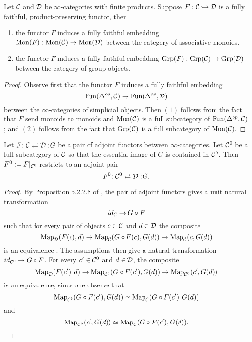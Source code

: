 \begin{proposition}
\label{induced fully faithfulness on group objects}
Let ${\mathcal{C}}$ and ${\mathcal{D}}$ be $\infty$-categories with finite products. Suppose $F:{\mathcal{C}} \hookrightarrow {\mathcal{D}}$ is a fully faithful, product-preserving functor, then
	\begin{enumerate}[(1)]
		\item the functor $F$ induces a fully faithful embedding $\operatorname{Mon}(F):\operatorname{Mon}({\mathcal{C}})\to \operatorname{Mon}({\mathcal{D}})$ between the category of associative monoids.
		\item the functor $F$ induces a fully faithful embedding $\operatorname{Grp}(F):\operatorname{Grp}({\mathcal{C}})\to \operatorname{Grp}({\mathcal{D}})$ between the category of group objects.
	\end{enumerate}
\end{proposition}
\begin{proof}
	Observe first that the functor $F$ induces a fully faithful embedding 
	$$
	\operatorname{Fun}(\Delta^{op},{\mathcal{C}})\to \operatorname{Fun}(\Delta^{op},{\mathcal{D}})
	$$ between the $\infty$-categories of simplicial objects.
	Then $(1)$ follows from the fact that $F$ send monoids to monoids and $\operatorname{Mon}({\mathcal{C}})$ is a full subcategory of $\operatorname{Fun}(\Delta^{op},{\mathcal{C}})$; and $(2)$ follows from the fact that $\operatorname{Grp}({\mathcal{C}})$ is a full subcategory of $\operatorname{Mon}({\mathcal{C}})$.
	
\end{proof}


\begin{proposition}
\label{Restrict adjoints to full subcategory}
	Let $F\negmedspace: {\mathcal{C}}\rightleftarrows {\mathcal{D}}:\negmedspace G$ be a pair of adjoint functors between $\infty$-categories.
	Let ${\mathcal{C}}^0$ be a full subcategory of ${\mathcal{C}}$ so that the essential image of $G$ is contained in ${\mathcal{C}}^0$. Then $F^0:=F|_{{\mathcal{C}}^0}$ restricts to an adjoint pair 
	$$
	F^0\negmedspace: {\mathcal{C}}^0\rightleftarrows {\mathcal{D}}:\negmedspace G.
	$$
\end{proposition}
\begin{proof}
    By Proposition 5.2.2.8 of \cite{HTT}, the pair of adjoint functors gives a unit natural transformation
    \[
    id_{{\mathcal{C}}} \to G\circ F
    \]
    such that for every pair of objects $c\in {\mathcal{C}}$ and $d\in {\mathcal{D}}$ the composite
    \[
    \operatorname{Map}_{{\mathcal{D}}}(F(c),d) \to \operatorname{Map}_{\mathcal{C}}(G\circ F(c),G(d)) \to \operatorname{Map}_{{\mathcal{C}}}(c,G(d))
    \]
    is an equivalence .
	The assumptions then give a natural transformation $id_{{\mathcal{C}}^{0}}\to G\circ F$.
	For every $c'\in {\mathcal{C}}^0$ and $d\in {\mathcal{D}}$, the composite 
	\[
	\operatorname{Map}_{{\mathcal{D}}}(F(c'),d) \to \operatorname{Map}_{{\mathcal{C}}^0}(G\circ F(c'),G(d)) \to \operatorname{Map}_{{\mathcal{C}}^{0}}(c',G(d))
	\] 
	is an equivalence, since one observe that
	$$
	\operatorname{Map}_{{\mathcal{C}}^0}(G\circ F(c'),G(d))\simeq \operatorname{Map}_{{\mathcal{C}}}(G\circ F(c'),G(d))
	$$
	and 
	$$
	\operatorname{Map}_{{\mathcal{C}}^0}(c',G(d))\simeq \operatorname{Map}_{{\mathcal{C}}}(G\circ F(c'),G(d)).
	$$
	\end{proof}


